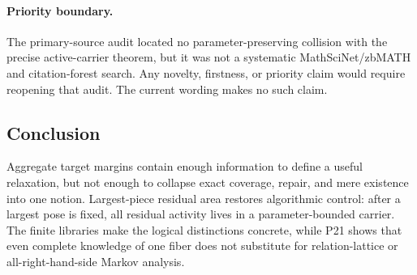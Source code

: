 \paragraph{Priority boundary.}
The primary-source audit located no parameter-preserving collision
with the precise active-carrier theorem, but it was not a systematic
MathSciNet/zbMATH and citation-forest search.  Any novelty, firstness, or
priority claim would require reopening that audit.  The current wording makes
no such claim.

\subsection{Conclusion}

Aggregate target margins contain enough information to define a useful
relaxation, but not enough to collapse exact coverage, repair, and mere
existence into one notion.  Largest-piece residual area restores algorithmic control:
after a largest pose is fixed, all residual activity lives in a
parameter-bounded carrier.  The finite libraries make the logical
distinctions concrete, while P21 shows that even complete knowledge of one
fiber does not substitute for relation-lattice or all-right-hand-side Markov
analysis.
